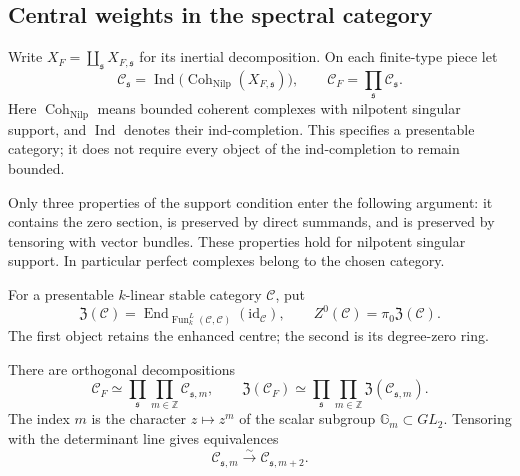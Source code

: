 \subsection{Central weights in the spectral category}

Write \(X_F=\coprod_{\mathfrak s}X_{F,\mathfrak s}\)
for its inertial decomposition. On each finite-type
piece let
\[
 \mathcal C_{\mathfrak s}
   =\operatorname{Ind}
       \bigl(\operatorname{Coh}_{\mathrm{Nilp}}
                    (X_{F,\mathfrak s})\bigr),
 \qquad
 \mathcal C_F=\prod_{\mathfrak s}\mathcal C_{\mathfrak s}.
\]
Here \(\operatorname{Coh}_{\mathrm{Nilp}}\) means
bounded coherent complexes with nilpotent singular
support, and \(\operatorname{Ind}\) denotes their
ind-completion. This specifies a presentable category;
it does not require every object of the
ind-completion to remain bounded.

Only three properties of the support condition enter
the following argument: it contains the zero section,
is preserved by direct summands, and is preserved by
tensoring with vector bundles. These properties hold
for nilpotent singular support. In particular perfect
complexes belong to the chosen category.

For a presentable \(k\)-linear stable category
\(\mathcal C\), put
\[
 \mathfrak Z(\mathcal C)
   =\operatorname{End}_{\operatorname{Fun}^L_k
                  (\mathcal C,\mathcal C)}
                    (\mathrm{id}_{\mathcal C}),
 \qquad Z^0(\mathcal C)=\pi_0\mathfrak Z(\mathcal C).
\]
The first object retains the enhanced centre; the
second is its degree-zero ring.

\begin{proposition}
\label{v4-arith:w10-e:prop:central-weights}
\ClaimStatusProvedHere
There are orthogonal decompositions
\[
 \mathcal C_F\simeq
    \prod_{\mathfrak s}\prod_{m\in\mathbb Z}
          \mathcal C_{\mathfrak s,m},
 \qquad
 \mathfrak Z(\mathcal C_F)\simeq
    \prod_{\mathfrak s}\prod_{m\in\mathbb Z}
          \mathfrak Z(\mathcal C_{\mathfrak s,m}).
\]
The index \(m\) is the character
\(z\mapsto z^m\) of the scalar subgroup
\(\mathbb G_m\subset GL_2\). Tensoring with the
determinant line gives equivalences
\[
 \mathcal C_{\mathfrak s,m}
     \xrightarrow{\sim}\mathcal C_{\mathfrak s,m+2}.
\]
\end{proposition}


